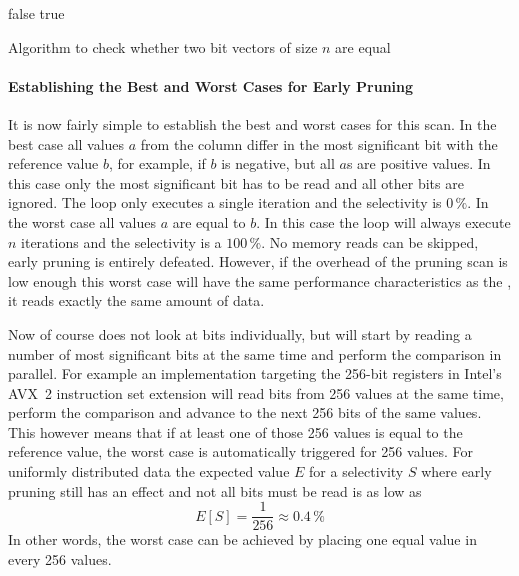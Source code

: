 \begin{algorithm}[h]
\begin{algorithmic}[1]
        \State \Return false
      \EndIf
    \EndFor
    \State \Return true
  \EndProcedure
\end{algorithmic}
\caption{Algorithm to check whether two bit vectors of size $n$ are equal}
\label{algo:equal}
\end{algorithm}

\paragraph{Establishing the Best and Worst Cases for Early Pruning}

It is now fairly simple to establish the best and worst cases for this scan. In
the best case all values $a$ from the column differ in the most significant bit
with the reference value $b$, for example, if $b$ is negative, but all $a$s are
positive values. In this case only the most significant bit has to be read and
all other bits are ignored. The loop only executes a single iteration and the
selectivity is $0\,\%$. In the worst case all values $a$ are equal to $b$. In
this case the loop will always execute $n$ iterations and the selectivity is a
$100\,\%$. No memory reads can be skipped, early pruning is entirely defeated.
However, if the overhead of the pruning scan is low enough this worst case will
have the same performance characteristics as the \simdscan{}, it reads exactly
the same amount of data.


Now of course \bwv{} does not look at bits individually, but will start by
reading a number of most significant bits at the same time and perform the
comparison in parallel. For example an implementation targeting the 256-bit
registers in Intel's AVX~2 instruction set extension will read bits from 256
values at the same time, perform the comparison and advance to the next 256 bits
of the same values. This however means that if at least one of those 256 values
is equal to the reference value, the worst case is automatically triggered for
256 values. For uniformly distributed data the expected value $E$ for a
selectivity $S$ where early pruning still has an effect and not all bits must be
read is as low as $$E[S]=\frac{1}{256}\approx 0.4\,\%$$ In other words, the
worst case can be achieved by placing one equal value in every 256 values.

